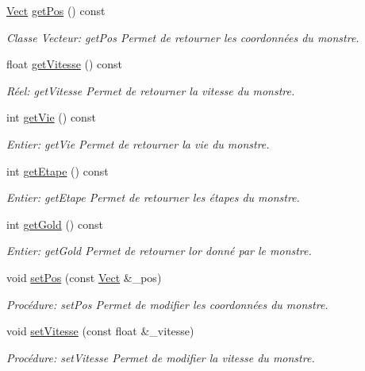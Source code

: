 \begin{DoxyCompactItemize}
\hyperlink{classVect}{Vect} \hyperlink{classMonstre_adbe0edd5d97aef18fb44ef163f368be6}{get\+Pos} () const
\begin{DoxyCompactList}\small\item\em Classe Vecteur\+: get\+Pos Permet de retourner les coordonnées du monstre. \end{DoxyCompactList}\item 
float \hyperlink{classMonstre_a8f94de3aed809fd81f283afce7c3feba}{get\+Vitesse} () const
\begin{DoxyCompactList}\small\item\em Réel\+: get\+Vitesse Permet de retourner la vitesse du monstre. \end{DoxyCompactList}\item 
int \hyperlink{classMonstre_a60b049ee5c4060f8aa512974414b2129}{get\+Vie} () const
\begin{DoxyCompactList}\small\item\em Entier\+: get\+Vie Permet de retourner la vie du monstre. \end{DoxyCompactList}\item 
int \hyperlink{classMonstre_a255b98ed4faab15ecd13a315414a5b94}{get\+Etape} () const
\begin{DoxyCompactList}\small\item\em Entier\+: get\+Etape Permet de retourner les étapes du monstre. \end{DoxyCompactList}\item 
int \hyperlink{classMonstre_a4a71cce5e0825e0e331bfdd3538a9b30}{get\+Gold} () const
\begin{DoxyCompactList}\small\item\em Entier\+: get\+Gold Permet de retourner l\textquotesingle{}or donné par le monstre. \end{DoxyCompactList}\item 
void \hyperlink{classMonstre_ac1ba6618f2a485ea20a448dbbddbf368}{set\+Pos} (const \hyperlink{classVect}{Vect} \&\+\_\+pos)
\begin{DoxyCompactList}\small\item\em Procédure\+: set\+Pos Permet de modifier les coordonnées du monstre. \end{DoxyCompactList}\item 
void \hyperlink{classMonstre_a900cdfe95acf91d17bcf8b33e2b59a97}{set\+Vitesse} (const float \&\+\_\+vitesse)
\begin{DoxyCompactList}\small\item\em Procédure\+: set\+Vitesse Permet de modifier la vitesse du monstre. \end{DoxyCompactList}\item 

\end{DoxyCompactItemize}
